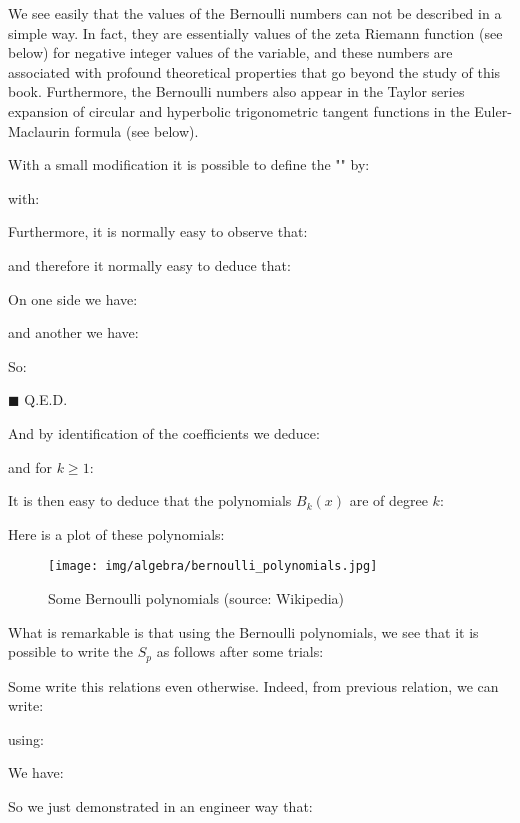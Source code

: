 	We see easily that the values of the Bernoulli numbers can not be described in a simple way. In fact, they are essentially values of the zeta Riemann function (see below) for negative integer values of the variable, and these numbers are associated with profound theoretical properties that go beyond the study of this book. Furthermore, the Bernoulli numbers also appear in the Taylor series expansion of  circular and hyperbolic trigonometric tangent functions in the Euler-Maclaurin formula (see below).
	
	With a small modification it is possible to define the "\label{bernoulli polynomials}" by:
	
	with:
	
	\begin{theorem}
	Furthermore, it is normally easy to observe that:
	
	and therefore it normally easy to deduce that:
	
	\end{theorem}
	\begin{dem}
	On one side we have:
	
	and another we have:
	
	So:
	
	\begin{flushright}
		$\blacksquare$  Q.E.D.
	\end{flushright}
	\end{dem}
	And by identification of the coefficients we deduce:
	
	and for $k \geq 1$:
	
	It is then easy to deduce that the polynomials $B_k(x)$ are of degree $k$:
	
	Here is a plot of these polynomials:
	\begin{figure}[H]
		\centering
		\texttt{[image: img/algebra/bernoulli\_polynomials.jpg]}
		\caption[Some Bernoulli polynomials]{Some Bernoulli polynomials (source: Wikipedia)}
	\end{figure}
	What is remarkable is that using the Bernoulli polynomials, we see that it is possible to write the $S_p$ as follows after some trials:
	
	
	Some write this relations even otherwise. Indeed, from previous relation, we can write:
	
	using:
	
	We have:
	
	So we just demonstrated in an engineer way that:
	
